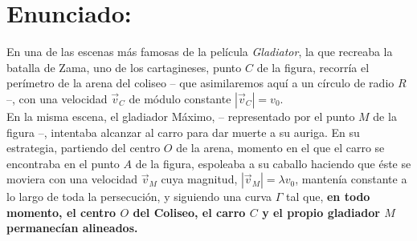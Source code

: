 \documentclass{article}
\begin{document}
\section*{Enunciado:}

\begin{mybox}
    En una de las escenas más famosas de la película \emph{Gladiator}, la que recreaba la batalla de Zama, uno de los cartagineses, punto $C$ de la figura, recorría el perímetro de la arena del coliseo -- que asimilaremos aquí a un círculo de radio $R$ --, con una velocidad $\vec{v}_C$ de módulo constante $|\vec{v}_C|=v_0$.\\

    En la misma escena, el gladiador Máximo, -- representado por el punto $M$ de la figura --, intentaba alcanzar al carro para dar muerte a su auriga. En su estrategia, partiendo del centro $O$ de la arena, momento en el que el carro se encontraba en el punto $A$ de la figura, espoleaba a su caballo haciendo que éste se moviera con una velocidad $\vec{v}_M$ cuya magnitud, $|\vec{v}_M|=\lambda v_0$, mantenía constante a lo largo de toda la persecución, y siguiendo una curva $\Gamma $ tal que, \textbf{en todo momento, el centro $O$ del Coliseo, el carro $C$ y el propio gladiador $M$ permanecían alineados.}\\


\end{mybox}
\end{document}
